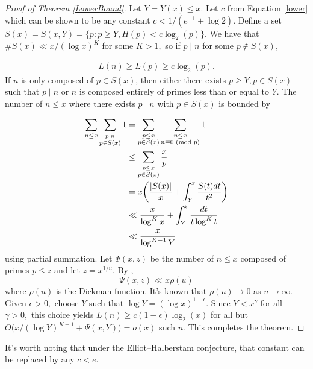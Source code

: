 \documentclass[12pt,regno]{amsart}
\begin{document}
\begin{proof}[Proof of Theorem \ref{LowerBound}]

Let $Y=Y(x) \le x.$ Let $c$ from Equation \eqref{lower} which can be shown to be any constant $c < 1/(e^{-1}+\log 2).$ Define a set $S(x)=S(x,Y)=\{p : p \ge Y, H(p) < c\log_2(p)  \}.$ We have that $\# S(x) \ll x/(\log x)^K$ for some $K>1,$ so if $p \mid n$ for some $p \notin S(x),$ 

\begin{align*}
L(n) \ge L(p) \ge c\log_2(p).
\end{align*}
If $n$ is only composed of $p \in S(x)$, then either there exists $p \ge Y, p\in S(x)$ such that $p \mid n$ or $n$ is composed entirely of primes less than or equal to $Y.$ The number of $n \le x$ where there exists $p \mid n$ with $p \in S(x)$ is bounded by

\begin{align*}
\sum_{n\le x}\sum_{\substack{ p \mid n \\ p \in S(x)}} 1 &= \sum_{\substack{ p \le x \\ p \in S(x)}}\sum_{\substack{ n \le x \\ n \equiv 0 {{\ifmmode\text{\rm\ (mod~${p}$)}\else\discretionary{}{}{\hbox{ }}\rm(mod~${p}$)\fi}}}}1 \\ & \le  \sum_{\substack{ p \le x \\ p \in S(x)}}\frac{x}{p}
\\ & = x\bigg(\frac{{\lvert{S(x)}\rvert}}{x} + \int_{Y}^{x}\frac{S(t)dt}{t^2}  \bigg)
\\ & \ll \frac{x}{\log^K x} + \int_{Y}^{x} \frac{dt}{t\log ^K t}
\\ & \ll \frac{x}{\log^{K-1}Y}
\end{align*} using partial summation. Let $\Psi(x,z)$ be the number of $n \le x$ composed of primes $p \le z$ and let $z=x^{1/u}.$  By \cite[Theorem 7.2]{MV}, $$\Psi(x,z) \ll x\rho(u)$$ where $\rho(u)$ is the Dickman function. It's known that $\rho(u)\rightarrow 0$ as $u \rightarrow \infty.$ Given $\epsilon > 0,$ choose $Y$ such that $\log Y = (\log x)^{1-\epsilon}.$ Since $Y<x^{\gamma}$ for all $\gamma>0,$ this choice yields
$L(n)\ge c(1-\epsilon)\log_2(x)$ for all but $O\big(x/(\log Y)^{K-1} + \Psi(x,Y)\big)=o(x)$ such $n.$ This completes the theorem.

\end{proof}

It's worth noting that under the Elliot--Halberstam conjecture, that constant can be replaced by any $c < e.$
\end{document}
